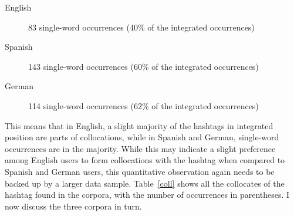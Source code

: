 \documentclass[output=paper,english,spanish,german,english]{langsci/langscibook}
\begin{document}
\begin{description}
  \item[English] 83 single-word occurrences (40\% of the integrated occurrences)
  \item[Spanish] 143 single-word occurrences (60\% of the integrated occurrences)
  \item[German] 114 single-word occurrences (62\% of the integrated occurrences)
\end{description}

\noindent This means that in English, a slight majority of the hashtags in integrated position are parts of collocations, while in Spanish and German, single-word occurrences are in the majority. While this may indicate a slight preference among English users to form collocations with the \mt hashtag when compared to Spanish and German users, this quantitative observation again needs to be backed up by a larger data sample. Table~\ref{coll} shows all the collocates of the \mt hashtag found in the corpora, with the number of occurrences in parentheses. I now discuss the three corpora in turn.
\end{document}
